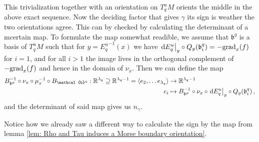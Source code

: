 \begin{remark}
 This trivialization together with an orientation on $T^u_qM$ orients the middle in the above exact sequence. Now the deciding factor that gives $\gamma$ its sign is weather the two orientations agree. This can by checked by calculating the determinant of a mcertain map. To formulate the map somewhat readible, we assume that $\mathfrak{b}^q$ is a basis of $T^u_qM$ such that for $y={E^u_q}^{-1}(x)$ we have $\left.\mathop{}\!\mathrm{d} {E^u_q}\right|_{y}\circ Q_y(\mathfrak{b}^q_i)=-\mathrm{grad}_x(f)$ for $i=1$, and for all $i>1$ the image lives in the orthogonal complement of $-\mathrm{grad}_x(f)$ and hence in the domain of $\nu_x$. Then we can define the map 
 \begin{align*}
 B_{\mathfrak{b}^p}^{-1}\circ \nu_x	\circ\mu_x^{-1}\circ B_{\mathcal{b}^q}: \R^{\lambda_q}\supseteq \R^{\lambda_q-1}=\langle e_2,\dots e_{\lambda_q}\rangle &\to \R^{\lambda_q-1}\\
 e_i &\mapsto B_{\mathfrak{b}^p}^{-1} \circ \nu_x \circ \restr{\diff E^u_q}{y}\circ Q_y (\mathfrak{b}^q_i)\,,
 \end{align*} and the determinant of said map gives us $n_\gamma$.
\end{remark}
 \begin{remark}
Notice how we already saw a different way to calculate the sign by the map from lemma \ref{lem: Rho and Tau induces a Morse boundary orientation}. 
\end{remark}
